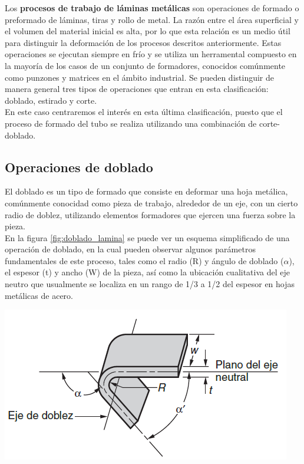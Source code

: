 Los \textbf{procesos de trabajo de láminas metálicas} son operaciones de formado o preformado 
de láminas, tiras y rollo de metal. La razón entre el área superficial y el volumen del material 
inicial es alta, por lo que esta relación es un medio útil para distinguir la deformación 
de los procesos descritos anteriormente. Estas operaciones se ejecutan siempre en frío y 
se utiliza un herramental compuesto en la mayoría de los casos de un conjunto de formadores, 
conocidos comúnmente como punzones y matrices en el ámbito industrial. Se pueden 
distinguir de manera general tres tipos de operaciones que entran en esta clasificación: 
doblado, estirado y corte.~\cite{groover2007}\\

En este caso centraremos el interés en esta última clasificación, puesto que el proceso 
de formado del tubo se realiza utilizando una combinación de corte-doblado.

\subsection{Operaciones de doblado}

El doblado es un tipo de formado que consiste en deformar una hoja metálica, 
comúnmente conocidad como pieza de trabajo, alrededor de un eje, con un cierto 
radio de doblez, utilizando elementos formadores que ejercen una fuerza 
sobre la pieza.\\

En la figura \ref{fig:doblado_lamina} se puede ver un esquema simplificado 
de una operación de doblado, en la cual pueden observar algunos parámetros 
fundamentales de este proceso, tales como el radio (R) y ángulo de doblado 
($\alpha$), el espesor (t) y ancho (W) de la pieza, así como la ubicación 
cualitativa del eje neutro que usualmente se localiza en un rango de 1/3 
a 1/2 del espesor en hojas metálicas de acero.

\begin{center}
\includegraphics[scale=0.9]{src/ch2/doblado_lamina.png}
\label{fig:doblado_lamina}
\end{center}

